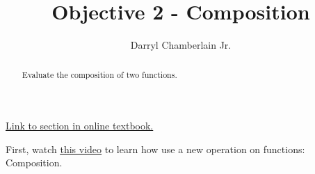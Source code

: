 \documentclass{ximera}
\author{Darryl Chamberlain Jr.}
\title{Objective 2 - Composition}
\begin{document}
\begin{abstract}
Evaluate the composition of two functions.
\end{abstract}
\maketitle
 
\href{https://cnx.org/contents/mwjClAV_@8.1:ik_Ed0Pa@12/Composition-of-Functions}{Link to section in online textbook.}
 
 
First, watch
\underline{\href{https://mediasite.video.ufl.edu/Mediasite/Play/cf54ade8e8594719ac48e17841a745401d}{this video}} to learn how use a new operation on functions: Composition.
 
\end{document}

